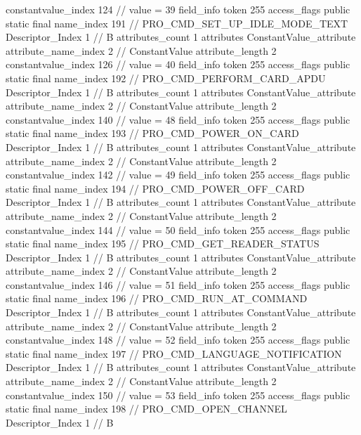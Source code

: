 {{{{{{{					constantvalue_index	124		// value = 39
				}
				}
			}
			field_info {
				token	255
				access_flags	public static final
				name_index	191		// PRO_CMD_SET_UP_IDLE_MODE_TEXT
				Descriptor_Index	1		// B
				attributes_count	1
				attributes {
				ConstantValue_attribute {
					attribute_name_index	2		// ConstantValue
					attribute_length	2
					constantvalue_index	126		// value = 40
				}
				}
			}
			field_info {
				token	255
				access_flags	public static final
				name_index	192		// PRO_CMD_PERFORM_CARD_APDU
				Descriptor_Index	1		// B
				attributes_count	1
				attributes {
				ConstantValue_attribute {
					attribute_name_index	2		// ConstantValue
					attribute_length	2
					constantvalue_index	140		// value = 48
				}
				}
			}
			field_info {
				token	255
				access_flags	public static final
				name_index	193		// PRO_CMD_POWER_ON_CARD
				Descriptor_Index	1		// B
				attributes_count	1
				attributes {
				ConstantValue_attribute {
					attribute_name_index	2		// ConstantValue
					attribute_length	2
					constantvalue_index	142		// value = 49
				}
				}
			}
			field_info {
				token	255
				access_flags	public static final
				name_index	194		// PRO_CMD_POWER_OFF_CARD
				Descriptor_Index	1		// B
				attributes_count	1
				attributes {
				ConstantValue_attribute {
					attribute_name_index	2		// ConstantValue
					attribute_length	2
					constantvalue_index	144		// value = 50
				}
				}
			}
			field_info {
				token	255
				access_flags	public static final
				name_index	195		// PRO_CMD_GET_READER_STATUS
				Descriptor_Index	1		// B
				attributes_count	1
				attributes {
				ConstantValue_attribute {
					attribute_name_index	2		// ConstantValue
					attribute_length	2
					constantvalue_index	146		// value = 51
				}
				}
			}
			field_info {
				token	255
				access_flags	public static final
				name_index	196		// PRO_CMD_RUN_AT_COMMAND
				Descriptor_Index	1		// B
				attributes_count	1
				attributes {
				ConstantValue_attribute {
					attribute_name_index	2		// ConstantValue
					attribute_length	2
					constantvalue_index	148		// value = 52
				}
				}
			}
			field_info {
				token	255
				access_flags	public static final
				name_index	197		// PRO_CMD_LANGUAGE_NOTIFICATION
				Descriptor_Index	1		// B
				attributes_count	1
				attributes {
				ConstantValue_attribute {
					attribute_name_index	2		// ConstantValue
					attribute_length	2
					constantvalue_index	150		// value = 53
				}
				}
			}
			field_info {
				token	255
				access_flags	public static final
				name_index	198		// PRO_CMD_OPEN_CHANNEL
				Descriptor_Index	1		// B
}}}}}

